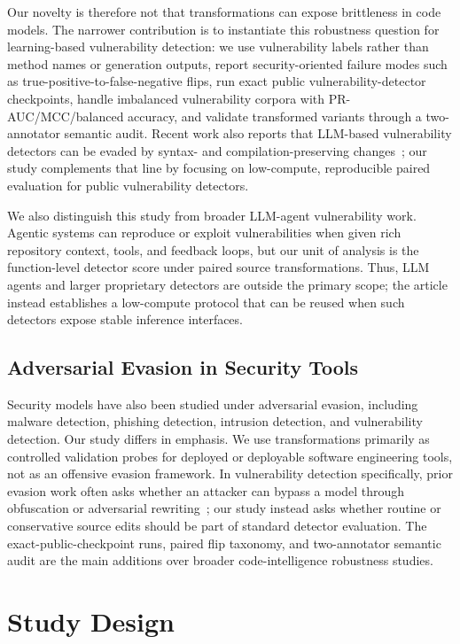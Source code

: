 \documentclass[a4paper,fleqn]{cas-dc}
\begin{document}
Our novelty is therefore not that transformations can expose brittleness in
code models. The narrower contribution is to instantiate this robustness
question for learning-based vulnerability detection: we use vulnerability
labels rather than method names or generation outputs, report security-oriented
failure modes such as true-positive-to-false-negative flips, run exact public
vulnerability-detector checkpoints, handle imbalanced vulnerability corpora
with PR-AUC/MCC/balanced accuracy, and validate transformed variants through a
two-annotator semantic audit. Recent work also reports that LLM-based
vulnerability detectors can be evaded by syntax- and compilation-preserving
changes~\cite{sun2026syntax}; our study complements that line by focusing on
low-compute, reproducible paired evaluation for public vulnerability detectors.

We also distinguish this study from broader LLM-agent vulnerability work.
Agentic systems can reproduce or exploit vulnerabilities when given rich
repository context, tools, and feedback loops, but our unit of analysis is the
function-level detector score under paired source transformations. Thus, LLM
agents and larger proprietary detectors are outside the primary scope; the
article instead establishes a low-compute protocol that can be reused when such
detectors expose stable inference interfaces.

\subsection{Adversarial Evasion in Security Tools}

Security models have also been studied under adversarial evasion, including
malware detection, phishing detection, intrusion detection, and vulnerability
detection. Our study differs in emphasis. We use transformations primarily as
controlled validation probes for deployed or deployable software engineering
tools, not as an offensive evasion framework. In vulnerability detection
specifically, prior evasion work often asks whether an attacker can bypass a
model through obfuscation or adversarial rewriting~\cite{sun2026syntax}; our
study instead asks whether routine or conservative source edits should be part
of standard detector evaluation. The exact-public-checkpoint runs, paired flip
taxonomy, and two-annotator semantic audit are the main additions over broader
code-intelligence robustness studies.

\section{Study Design}
\end{document}
